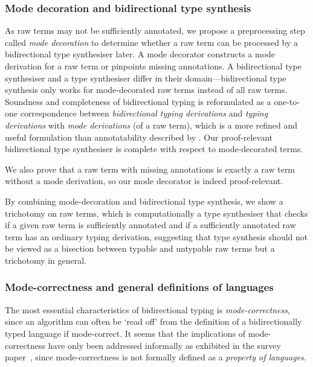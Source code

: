 \subsubsection{Mode decoration and bidirectional type synthesis}
As raw terms may not be sufficiently annotated, we propose a preprocessing step called \emph{mode decoration} to determine whether a raw term can be processed by a bidirectional type synthesiser later.
A mode decorator constructs a mode derivation for a raw term or pinpoints missing annotations.
A bidirectional type synthesiser and a type synthesiser differ in their domain---bidirectional type synthesis only works for mode-decorated raw terms instead of all raw terms.
Soundness and completeness of bidirectional typing is reformulated as a one-to-one correspondence between \emph{bidirectional typing derivations} and \emph{typing derivations} with \emph{mode derivations} (of a raw term), which is a more refined and useful formulation than annotatability described by \citet[Section~3.2]{Dunfield2021}.
Our proof-relevant bidirectional type synthesiser is complete with respect to mode-decorated terms.

We also prove that a raw term with missing annotations is exactly a raw term without a mode derivation, so our mode decorator is indeed proof-relevant.

By combining mode-decoration and bidirectional type synthesis, we show a trichotomy on raw terms, which is computationally a type synthesiser that checks if a given raw term is sufficiently annotated and if a sufficiently annotated raw term has an ordinary typing derivation, suggesting that type synthesis should not be viewed as a bisection between typable and untypable raw terms but a trichotomy in general.

\subsubsection{Mode-correctness and general definitions of languages}
\label{sec:language-formalisation}
The most essential characteristics of bidirectional typing is \emph{mode-correctness}, since an algorithm can often be `read off' from the definition of a bidirectionally typed language if mode-correct.
It seems that the implications of mode-correctness have only been addressed informally as exhibited in the survey paper~\cite{Dunfield2021}, since mode-correctness is not formally defined as a \emph{property of languages}.

